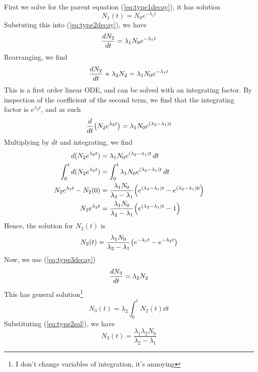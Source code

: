 \documentclass[12pt,a4paper]{article}
\begin{document}
\begin{solution_pset}
\begin{enumerate}[\textbf{(\alph*)}]
				  First we solve for the parent equation (\ref{eq:type1decay}), it has solution
				  \begin{equation}
				  	\label{eq:type1sol}
				     N_1(t) = N_0 e^{-\lambda_1 t}
				  \end{equation}
				  Substuting this into (\ref{eq:type2decay}), we have
				  \[
					  \dv{N_2}{t} = \lambda_1 N_0 e^{-\lambda_1 t} 
				  \]
				  Rearranging, we find
				  \begin{equation}
				  	\label{eq:typ2setup}
				    \dv{N_2}{t} + \lambda_2 N_2 = \lambda_1 N_0 e^{-\lambda_1 t} 
				  \end{equation}
				  This is a first order linear ODE, and can be solved with an
				  integrating factor. By inspection of the coefficient of the second term, 
				  we find that the integrating 
				  factor is $e^{\lambda_2 t}$, and as such
				  \begin{equation}
				  	\label{eq:type2setup2}
				    \dv{}{t}\pqty{N_2 e^{\lambda_2 t}} 
					=
					\lambda_1 N_0 e^{(\lambda_2 - \lambda_1)t}
				  \end{equation}
				  Multiplying by $dt$ and integrating, we find
				  \begin{align*}
					d(N_2 e^{\lambda_2 t}) 
					&= 
					\lambda_1 N_0 e^{(\lambda_2 - \lambda_1)t} \dd{t}\\
					\int_0^t d(N_2 e^{\lambda_2 t}) 
					&= 
					\int_0^t \lambda_1 N_0 e^{(\lambda_2 - \lambda_1)t} \dd{t}\\
					N_2 e^{\lambda_2 t} - N_2(0)
					&=
					\frac{\lambda_1 N_0}{\lambda_2 - \lambda_1}\pqty{
						e^{(\lambda_2 - \lambda_1)t} - 
						e^{(\lambda_2 - \lambda_1)0} 
					} \\
					N_2 e^{\lambda_2 t}
					&=
					\frac{\lambda_1 N_0}{\lambda_2 - \lambda_1}\pqty{
						e^{(\lambda_2 - \lambda_1)t} - 1
					} 
				  \end{align*}
				  Hence, the solution for $N_2(t)$ is
				  \begin{equation}
				  	\label{eq:type2sol}
					N_2(t) 
					=
					\frac{\lambda_1 N_0}{\lambda_2 - \lambda_1}\pqty{
						e^{- \lambda_1 t} - e^{-\lambda_2 t}
					} 
				  \end{equation}
				  Now, we use (\ref{eq:type3decay})
				  \[
					  \dv{N_3}{t} = \lambda_2 N_2
				  \]
				  This has general solution\footnote{I don't change variables of integration, it's annoying}
				  \[
					  N_3(t) = \lambda_2 \int_0^t N_2(t)\dd{t}
				  \]
				  Substituting (\ref{eq:type2sol}), we have
				  \[
					  N_3(t) = \frac{\lambda_1\lambda_2 N_0}{\lambda_2 - \lambda_1}
\]
\end{enumerate}
\end{solution_pset}
\end{document}
